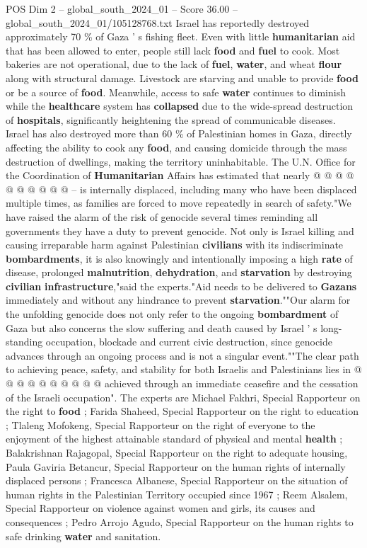 \begin{textsample}{POS Dim 2 – global\_south\_2024\_01 – Score 36.00 – global\_south\_2024\_01/105128768.txt}
Israel has reportedly destroyed approximately 70 \% of Gaza ' s fishing fleet.
Even with little \textbf{humanitarian} aid that has been allowed to enter, people still lack \textbf{food} and \textbf{fuel} to cook.
Most bakeries are not operational, due to the lack of \textbf{fuel}, \textbf{water}, and wheat \textbf{flour} along with structural damage.
Livestock are starving and unable to provide \textbf{food} or be a source of \textbf{food}.
Meanwhile, access to safe \textbf{water} continues to diminish while the \textbf{healthcare} system has \textbf{collapsed} due to the wide-spread destruction of \textbf{hospitals}, significantly heightening the spread of communicable diseases.
Israel has also destroyed more than 60 \% of Palestinian homes in Gaza, directly affecting the ability to cook any \textbf{food}, and causing domicide through the mass destruction of dwellings, making the territory uninhabitable.
The U.N.
Office for the Coordination of \textbf{Humanitarian} Affairs has estimated that nearly @ @ @ @ @ @ @ @ @ @ -- is internally displaced, including many who have been displaced multiple times, as families are forced to move repeatedly in search of safety."We have raised the alarm of the risk of genocide several times reminding all governments they have a duty to prevent genocide.
Not only is Israel killing and causing irreparable harm against Palestinian \textbf{civilians} with its indiscriminate \textbf{bombardments}, it is also knowingly and intentionally imposing a high \textbf{rate} of disease, prolonged \textbf{malnutrition}, \textbf{dehydration}, and \textbf{starvation} by destroying \textbf{civilian} \textbf{infrastructure},"said the experts."Aid needs to be delivered to \textbf{Gazans} immediately and without any hindrance to prevent \textbf{starvation}.""Our alarm for the unfolding genocide does not only refer to the ongoing \textbf{bombardment} of Gaza but also concerns the slow suffering and death caused by Israel ' s long-standing occupation, blockade and current civic destruction, since genocide advances through an ongoing process and is not a singular event.""The clear path to achieving peace, safety, and stability for both Israelis and Palestinians lies in @ @ @ @ @ @ @ @ @ @ achieved through an immediate ceasefire and the cessation of the Israeli occupation".
The experts are Michael Fakhri, Special Rapporteur on the right to \textbf{food} ; Farida Shaheed, Special Rapporteur on the right to education ; Tlaleng Mofokeng, Special Rapporteur on the right of everyone to the enjoyment of the highest attainable standard of physical and mental \textbf{health} ; Balakrishnan Rajagopal, Special Rapporteur on the right to adequate housing, Paula Gaviria Betancur, Special Rapporteur on the human rights of internally displaced persons ; Francesca Albanese, Special Rapporteur on the situation of human rights in the Palestinian Territory occupied since 1967 ; Reem Alsalem, Special Rapporteur on violence against women and girls, its causes and consequences ; Pedro Arrojo Agudo, Special Rapporteur on the human rights to safe drinking \textbf{water} and sanitation.


\end{textsample}
